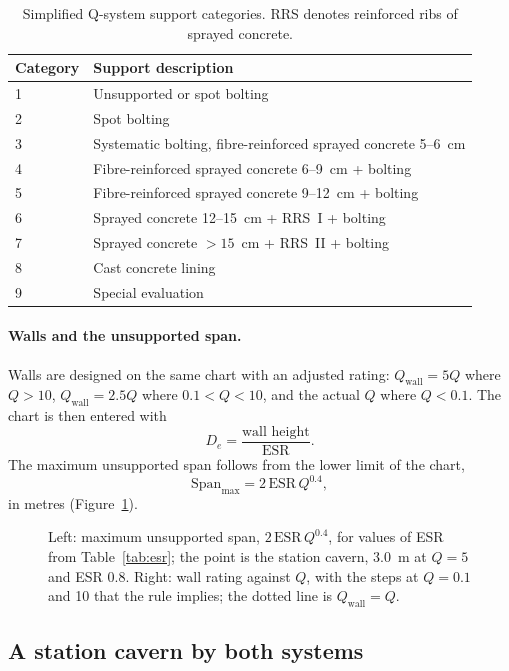 \begin{table}[htbp]
\caption{Simplified Q-system support categories. RRS denotes reinforced ribs of sprayed concrete.}
\label{tab:q-support-categories}
\centering
\small
\begin{tabular}{ll}
\toprule
\textbf{Category} & \textbf{Support description} \\
\midrule
1 & Unsupported or spot bolting \\
2 & Spot bolting \\
3 & Systematic bolting, fibre-reinforced sprayed concrete 5--6~cm \\
4 & Fibre-reinforced sprayed concrete 6--9~cm + bolting \\
5 & Fibre-reinforced sprayed concrete 9--12~cm + bolting \\
6 & Sprayed concrete 12--15~cm + RRS~I + bolting \\
7 & Sprayed concrete $>15$~cm + RRS~II + bolting \\
8 & Cast concrete lining \\
9 & Special evaluation \\
\bottomrule
\end{tabular}
\end{table}

\paragraph{Walls and the unsupported span.}
Walls are designed on the same chart with an adjusted rating: $Q_{\text{wall}}
= 5Q$ where $Q > 10$, $Q_{\text{wall}} = 2.5Q$ where $0.1 < Q < 10$, and the
actual $Q$ where $Q < 0.1$. The chart is then entered with
\[
D_e = \frac{\text{wall height}}{\text{ESR}} .
\]
The maximum unsupported span follows from the lower limit of the chart,
\[
\mathrm{Span}_{\max} = 2 \, \mathrm{ESR} \, Q^{0.4} ,
\]
in metres (Figure~\ref{fig:q-span-wall}).

\begin{figure}[htbp]
\centering
{}
\caption{Left: maximum unsupported span, $2\,\mathrm{ESR}\,Q^{0.4}$, for values of ESR from Table~\ref{tab:esr}; the point is the station cavern, 3.0~m at $Q = 5$ and ESR 0.8. Right: wall rating against $Q$, with the steps at $Q = 0.1$ and 10 that the rule implies; the dotted line is $Q_{\text{wall}} = Q$.}
\label{fig:q-span-wall}
\end{figure}

\subsection{A station cavern by both systems}
\label{sec:station-cavern-example}

